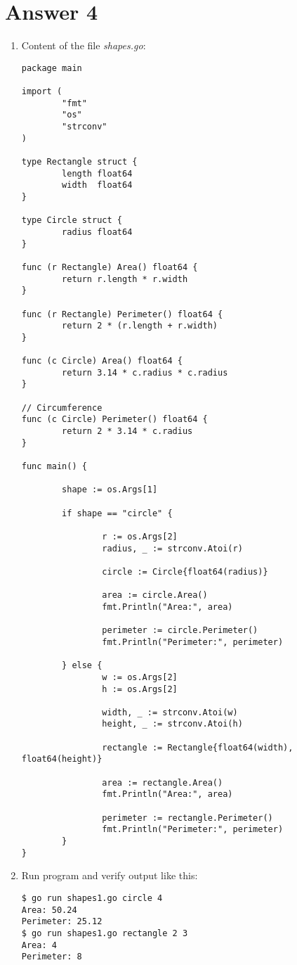 \documentclass[11pt,a4paper]{article}
\begin{document}
\section*{Answer 4}
\begin{enumerate}
\item Content of the file {\it shapes.go}:
\begin{verbatim}
package main

import (
        "fmt"
        "os"
        "strconv"
)

type Rectangle struct {
        length float64
        width  float64
}

type Circle struct {
        radius float64
}

func (r Rectangle) Area() float64 {
        return r.length * r.width
}

func (r Rectangle) Perimeter() float64 {
        return 2 * (r.length + r.width)
}

func (c Circle) Area() float64 {
        return 3.14 * c.radius * c.radius
}

// Circumference
func (c Circle) Perimeter() float64 {
        return 2 * 3.14 * c.radius
}

func main() {

        shape := os.Args[1]

        if shape == "circle" {

                r := os.Args[2]
                radius, _ := strconv.Atoi(r)

                circle := Circle{float64(radius)}

                area := circle.Area()
                fmt.Println("Area:", area)

                perimeter := circle.Perimeter()
                fmt.Println("Perimeter:", perimeter)

        } else {
                w := os.Args[2]
                h := os.Args[2]

                width, _ := strconv.Atoi(w)
                height, _ := strconv.Atoi(h)

                rectangle := Rectangle{float64(width), float64(height)}

                area := rectangle.Area()
                fmt.Println("Area:", area)

                perimeter := rectangle.Perimeter()
                fmt.Println("Perimeter:", perimeter)
        }
}
\end{verbatim}

\item Run program and verify output like this:
\begin{verbatim}
$ go run shapes1.go circle 4
Area: 50.24
Perimeter: 25.12
$ go run shapes1.go rectangle 2 3
Area: 4
Perimeter: 8
\end{verbatim}

\end{enumerate}
\end{document}
